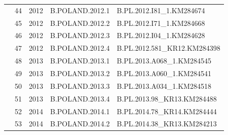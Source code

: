 \begin{table}[htbp]
\begin{tabular}{|cllll|}
\multicolumn{1}{|c|}{}                                  & \multicolumn{1}{l|}{44}          & \multicolumn{1}{l|}{2012}          & \multicolumn{1}{l|}{B.POLAND.2012.1}    & B.PL.2012.I81\_1.KM284674       \\ \cline{2-5} 
\multicolumn{1}{|c|}{}                                  & \multicolumn{1}{l|}{45}          & \multicolumn{1}{l|}{2012}          & \multicolumn{1}{l|}{B.POLAND.2012.2}    & B.PL.2012.I71\_1.KM284668       \\ \cline{2-5} 
\multicolumn{1}{|c|}{}                                  & \multicolumn{1}{l|}{46}          & \multicolumn{1}{l|}{2012}          & \multicolumn{1}{l|}{B.POLAND.2012.3}    & B.PL.2012.I04\_1.KM284628       \\ \cline{2-5} 
\multicolumn{1}{|c|}{}                                  & \multicolumn{1}{l|}{47}          & \multicolumn{1}{l|}{2012}          & \multicolumn{1}{l|}{B.POLAND.2012.4}    & B.PL.2012.581\_KR12.KM284398    \\ \cline{2-5} 
\multicolumn{1}{|c|}{}                                  & \multicolumn{1}{l|}{48}          & \multicolumn{1}{l|}{2013}          & \multicolumn{1}{l|}{B.POLAND.2013.1}    & B.PL.2013.A068\_1.KM284545      \\ \cline{2-5} 
\multicolumn{1}{|c|}{}                                  & \multicolumn{1}{l|}{49}          & \multicolumn{1}{l|}{2013}          & \multicolumn{1}{l|}{B.POLAND.2013.2}    & B.PL.2013.A060\_1.KM284541      \\ \cline{2-5} 
\multicolumn{1}{|c|}{}                                  & \multicolumn{1}{l|}{50}          & \multicolumn{1}{l|}{2013}          & \multicolumn{1}{l|}{B.POLAND.2013.3}    & B.PL.2013.A034\_1.KM284518      \\ \cline{2-5} 
\multicolumn{1}{|c|}{}                                  & \multicolumn{1}{l|}{51}          & \multicolumn{1}{l|}{2013}          & \multicolumn{1}{l|}{B.POLAND.2013.4}    & B.PL.2013.98\_KR13.KM284488     \\ \cline{2-5} 
\multicolumn{1}{|c|}{}                                  & \multicolumn{1}{l|}{52}          & \multicolumn{1}{l|}{2014}          & \multicolumn{1}{l|}{B.POLAND.2014.1}    & B.PL.2014.78\_KR14.KM284444     \\ \cline{2-5} 
\multicolumn{1}{|c|}{}                                  & \multicolumn{1}{l|}{53}          & \multicolumn{1}{l|}{2014}          & \multicolumn{1}{l|}{B.POLAND.2014.2}    & B.PL.2014.38\_KR13.KM284213     \\ \cline{2-5} 

\end{tabular}
\end{table}
